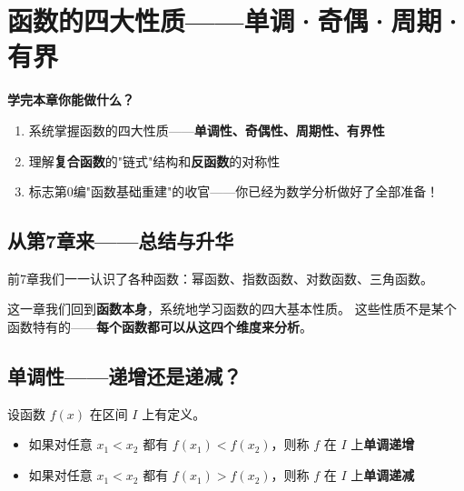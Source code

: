 
\chapter{函数的四大性质——单调·奇偶·周期·有界}

\begin{applicationbox}
\textbf{学完本章你能做什么？}
\begin{enumerate}
  \item 系统掌握函数的四大性质——\textbf{单调性、奇偶性、周期性、有界性}
  \item 理解\textbf{复合函数}的"链式"结构和\textbf{反函数}的对称性
  \item 标志第0编"函数基础重建"的收官——你已经为数学分析做好了全部准备！
\end{enumerate}
\end{applicationbox}


\section{从第7章来——总结与升华}

前7章我们一一认识了各种函数：幂函数、指数函数、对数函数、三角函数。

这一章我们回到\textbf{函数本身}，系统地学习函数的四大基本性质。
这些性质不是某个函数特有的——\textbf{每个函数都可以从这四个维度来分析}。

\begin{center}
\end{center}


\section{单调性——递增还是递减？}

\begin{definitionbox}[单调性]
设函数 \(f(x)\) 在区间 \(I\) 上有定义。
\begin{itemize}
  \item 如果对任意 \(x_1 < x_2\) 都有 \(f(x_1) < f(x_2)\)，则称 \(f\) 在 \(I\) 上\textbf{单调递增}
  \item 如果对任意 \(x_1 < x_2\) 都有 \(f(x_1) > f(x_2)\)，则称 \(f\) 在 \(I\) 上\textbf{单调递减}
\end{itemize}
\end{definitionbox}

